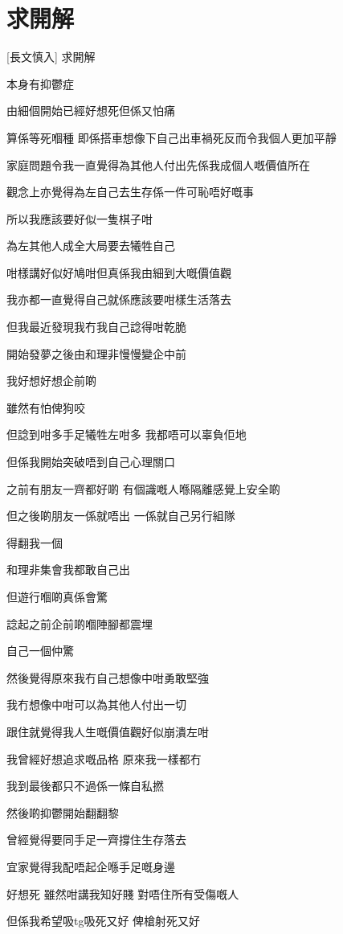 \chapter{求開解}

[長文慎入] 求開解



本身有抑鬱症

由細個開始已經好想死但係又怕痛

算係等死嗰種 即係搭車想像下自己出車禍死反而令我個人更加平靜

家庭問題令我一直覺得為其他人付出先係我成個人嘅價值所在

觀念上亦覺得為左自己去生存係一件可恥唔好嘅事

所以我應該要好似一隻棋子咁

為左其他人成全大局要去犧牲自己

咁樣講好似好鳩咁但真係我由細到大嘅價值觀

我亦都一直覺得自己就係應該要咁樣生活落去

但我最近發現我冇我自己諗得咁乾脆

開始發夢之後由和理非慢慢變企中前

我好想好想企前啲

雖然有怕俾狗咬

但諗到咁多手足犧牲左咁多 我都唔可以辜負佢地

但係我開始突破唔到自己心理關口

之前有朋友一齊都好啲 有個識嘅人喺隔離感覺上安全啲

但之後啲朋友一係就唔出 一係就自己另行組隊

得翻我一個

和理非集會我都敢自己出

但遊行嗰啲真係會驚

諗起之前企前啲嗰陣腳都震埋

自己一個仲驚

然後覺得原來我冇自己想像中咁勇敢堅強

我冇想像中咁可以為其他人付出一切

跟住就覺得我人生嘅價值觀好似崩潰左咁

我曾經好想追求嘅品格 原來我一樣都冇

我到最後都只不過係一條自私撚

然後啲抑鬱開始翻翻黎

曾經覺得要同手足一齊撐住生存落去

宜家覺得我配唔起企喺手足嘅身邊

好想死 雖然咁講我知好賤 對唔住所有受傷嘅人

但係我希望吸tg吸死又好 俾槍射死又好

